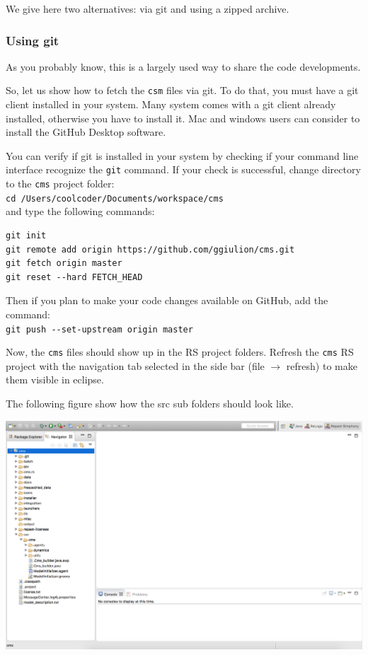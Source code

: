 \documentclass{article}
\begin{document}
We give here two alternatives: via git and using a zipped archive.

\subsubsection{Using git}

As you probably know, this is a largely used way to share the code developments.

So, let us show how to fetch the \verb+csm+ files via git. To do that, you must have a git client installed in your system. Many system comes with a git client already installed, otherwise you have to install it. Mac and windows users can consider to install the GitHub Desktop software.

You can verify if git is installed in your system by checking if your command line interface recognize the \verb+git+ command.  
If your check is successful, change directory to the \verb+cms+ project folder:\\
\verb+cd /Users/coolcoder/Documents/workspace/cms+\\
and type the following commands:
\begin{verbatim}
git init
git remote add origin https://github.com/ggiulion/cms.git
git fetch origin master
git reset --hard FETCH_HEAD
\end{verbatim}

Then if you plan to make your code changes available on GitHub, add the command:\\
\verb+git push --set-upstream origin master+

Now, the \verb+cms+ files should show up in the RS project folders.
Refresh the \verb+cms+ RS project with the navigation tab selected in the side bar (file $\rightarrow$ refresh) to make them visible in eclipse.

The following figure show how the src sub folders should look like.

\vskip2mm
\noindent
\includegraphics[scale=0.35]{fig_cms_rs_navigation1}
\end{document}
